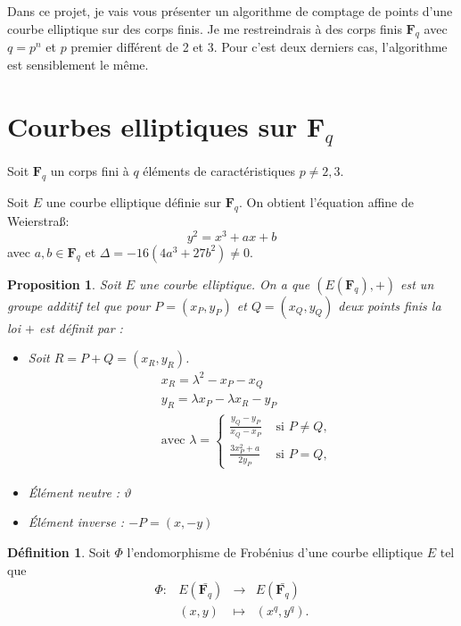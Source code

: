 \documentclass{article}%
\theoremstyle{plain}
\theoremstyle{definition}
\newtheorem{definition}{Définition}[section]
\theoremstyle{plain}
\newtheorem{proposition}{Proposition}[section]
\theoremstyle{plain}
\theoremstyle{remark}
\newcommand\fq{\mathbf{F}_{q}}
\begin{document}
Dans ce projet, je vais vous présenter un algorithme de comptage de points d'une courbe elliptique sur des corps finis. Je me restreindrais à des corps finis $\fq$ avec $q=p^{n}$ et $p$ premier différent de 2 et 3. Pour c'est deux derniers cas, l'algorithme est sensiblement le même. 

\section{Courbes elliptiques sur $\fq$}

Soit $\fq$ un corps fini à $q$ éléments de caractéristiques $p\neq 2,3$.

Soit $E$ une courbe elliptique définie sur $\fq$. On obtient l'équation affine de Weierstra\ss : 
\begin{equation}
y^{2} = x^{3} + ax + b
\label{ecc}
\end{equation} 
avec $a,b\in\fq$ et $\Delta = -16(4a^{3} + 27b^{2}) \neq 0$.

\begin{proposition}
Soit $E$ une courbe elliptique. On a que $(E(\fq), +)$ est un groupe additif tel que pour $P=(x_{P}, y_{P})$ et $Q=(x_{Q}, y_{Q})$ deux points finis la loi $+$ est définit par :
\begin{itemize}
\item Soit $R = P+Q = (x_{R}, y_{R})$.
\begin{align*}
    &x_{R} = \lambda^{2} - x_{P} - x_{Q}\\
    &y_{R} = \lambda x_{P} - \lambda x_{R} - y_{P}\\
    & \text{avec }\lambda = \begin{cases}
      \frac{y_{Q} - y_{P}}{x_{Q} - x_{P}} &\text{ si } P\neq Q,\\
      \frac{3x_{P}^{2} + a}{2y_{P}} &\text{ si } P=Q,
    \end{cases}
\end{align*}
\item Élément neutre : $\vartheta$
\item Élément inverse : $-P = (x,-y)$
\end{itemize}
\end{proposition}

\begin{definition}
Soit $\varPhi$ l'endomorphisme de Frobénius d'une courbe elliptique $E$ tel que  
$$\begin{array}{clcl}
\varPhi : &E(\bar{\fq}) &\longrightarrow &E(\bar{\fq})\\
&(x, y) &\longmapsto	&(x^{q}, y^{q}).\\
\end{array}$$
\end{definition}
\end{document}
